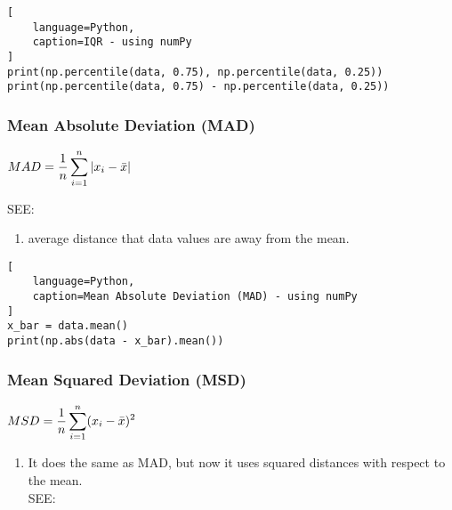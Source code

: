 \begin{lstlisting}[
    language=Python, 
    caption=IQR - using numPy
]
print(np.percentile(data, 0.75), np.percentile(data, 0.25))
print(np.percentile(data, 0.75) - np.percentile(data, 0.25))
\end{lstlisting}


\subsubsection{Mean Absolute Deviation (MAD) \cite{statistics/book/Statistics-for-Data-Scientists/Maurits-Kaptein}} \label{Data/Describing Data/Central Tendency/Mean Absolute Deviation (MAD)}

$
    MAD
    = \dfrac{1}{n} \displaystyle\sum_{i=1}^{n} \left| x_i - \bar{x} \right|
$ \hfill \cite{statistics/book/Statistics-for-Data-Scientists/Maurits-Kaptein}

\vspace{0.2cm}

SEE: 

\vspace{0.2cm}

\begin{enumerate}
    \item average distance that data values are away from the mean. \hfill \cite{statistics/book/Statistics-for-Data-Scientists/Maurits-Kaptein}
\end{enumerate}

\begin{lstlisting}[
    language=Python, 
    caption=Mean Absolute Deviation (MAD) - using numPy
]
x_bar = data.mean()
print(np.abs(data - x_bar).mean())
\end{lstlisting}



\subsubsection{Mean Squared Deviation (MSD) \cite{statistics/book/Statistics-for-Data-Scientists/Maurits-Kaptein}} \label{Data/Describing Data/Central Tendency/Mean Squared Deviation (MSD)}

$
    MSD
    = \dfrac{1}{n} \displaystyle\sum_{i=1}^{n} (x_i - \bar{x})^2
$ \hfill \cite{statistics/book/Statistics-for-Data-Scientists/Maurits-Kaptein}

\begin{enumerate}
    \item It does the same as MAD, but now it uses squared distances with respect to the mean.  \hfill \cite{statistics/book/Statistics-for-Data-Scientists/Maurits-Kaptein}\\
    SEE: 
    
\end{enumerate}


